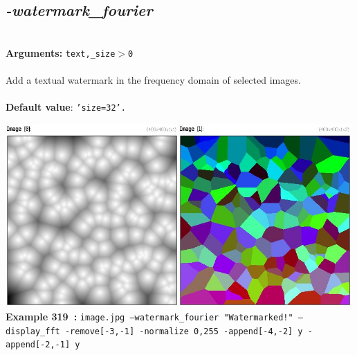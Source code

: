 \documentclass[a4paper,11pt,twoside]{book}
\begin{document}
\subsection{\emph{-watermark\_fourier} }\vspace*{-0.5em}
~\\\textbf{Arguments: } 
{\small \texttt{text,\_size$>$0}}\\~\\
Add a textual watermark in the frequency domain of selected images.
~\\~\\\textbf{Default value}: {\small \texttt{'size=32'.}}
\begin{center}\includegraphics[keepaspectratio=true,height=7cm,width=\textwidth]{img/gmic_def319.jpg}\\
{\footnotesize \textbf{Example 319~:} \texttt{image.jpg --watermark\_fourier "Watermarked!" --display\_fft -remove[-3,-1] -normalize 0,255 -append[-4,-2] y -append[-2,-1] y}}
\end{center}
\end{document}
